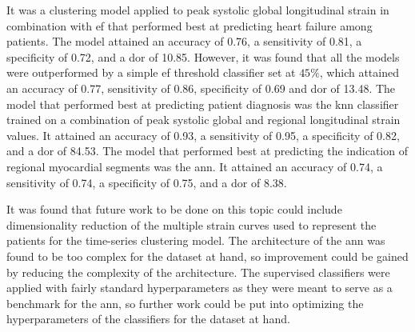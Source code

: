 It was a clustering model applied to peak systolic global longitudinal strain in combination with \acrshort{ef} that performed best at predicting heart failure among patients. The model attained an accuracy of 0.76, a sensitivity of 0.81, a specificity of 0.72, and a \acrshort{dor} of 10.85. However, it was found that all the models were outperformed by a simple \acrshort{ef} threshold classifier set at $45\%$, which attained an accuracy of 0.77, sensitivity of 0.86, specificity of 0.69 and \acrshort{dor} of 13.48. The model that performed best at predicting patient diagnosis was the \acrlong{knn} classifier trained on a combination of peak systolic global and regional longitudinal strain values. It attained an accuracy of 0.93, a sensitivity of 0.95, a specificity of 0.82, and a \acrshort{dor} of 84.53. The model that performed best at predicting the indication of regional myocardial segments was the \acrshort{ann}. It attained an accuracy of 0.74, a sensitivity of 0.74, a specificity of 0.75, and a \acrshort{dor} of 8.38. \bigskip

It was found that future work to be done on this topic could include dimensionality reduction of the multiple strain curves used to represent the patients for the time-series clustering model. The architecture of the \acrshort{ann} was found to be too complex for the dataset at hand, so improvement could be gained by reducing the complexity of the architecture. The supervised classifiers were applied with fairly standard hyperparameters as they were meant to serve as a benchmark for the \acrshort{ann}, so further work could be put into optimizing the hyperparameters of the classifiers for the dataset at hand.

\clearpage